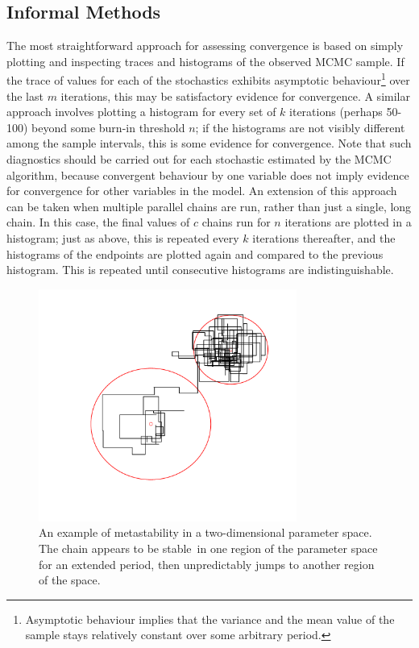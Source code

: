 \documentclass[]{jss}
\begin{document}
\subsection{Informal Methods}

The most straightforward approach for assessing convergence is based on simply plotting and inspecting traces and histograms of the observed MCMC sample. If the trace of values for each of the stochastics exhibits asymptotic behaviour\footnote{Asymptotic behaviour implies that the variance and the mean value of the sample stays relatively constant over some arbitrary period.} over the last $m$ iterations, this may be satisfactory evidence for convergence. A similar approach involves plotting a histogram for every set of $k$ iterations (perhaps 50-100) beyond some burn-in threshold $n$; if the histograms are not visibly different among the sample intervals, this is some evidence for convergence. Note that such diagnostics should be carried out for each stochastic estimated by the MCMC algorithm, because convergent behaviour by one variable does not imply evidence for convergence for other variables in the model. An extension of this approach can be taken when multiple parallel chains are run, rather than just a single, long chain. In this case, the final values of $c$ chains run for $n$ iterations are plotted in a histogram; just as above, this is repeated every $k$ iterations thereafter, and the histograms of the endpoints are plotted again and compared to the previous histogram. This is repeated until consecutive histograms are indistinguishable.

\begin{figure}[h]
\begin{center}
\includegraphics[height=3in]{metastable.pdf}
\caption{An example of metastability in a two-dimensional parameter space. The chain appears to be stable~in one region of the parameter space for an extended period, then unpredictably jumps to another region of the space.}
\label{fig:metas}
\end{center}
\end{figure}
\end{document}

